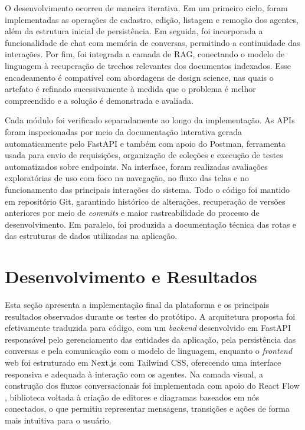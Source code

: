\documentclass[12pt, openright, oneside, a4paper, brazil]{ads-unipac-abntex2}
\begin{document}
O desenvolvimento ocorreu de maneira iterativa. Em um primeiro ciclo, foram implementadas as operações de cadastro, edição, listagem e remoção dos agentes, além da estrutura inicial de persistência. Em seguida, foi incorporada a funcionalidade de chat com memória de conversas, permitindo a continuidade das interações. Por fim, foi integrada a camada de RAG, conectando o modelo de linguagem à recuperação de trechos relevantes dos documentos indexados. Esse encadeamento é compatível com abordagens de design science, nas quais o artefato é refinado sucessivamente à medida que o problema é melhor compreendido e a solução é demonstrada e avaliada. 

Cada módulo foi verificado separadamente ao longo da implementação. As APIs foram inspecionadas por meio da documentação interativa gerada automaticamente pelo FastAPI e também com apoio do Postman, ferramenta usada para envio de requisições, organização de coleções e execução de testes automatizados sobre endpoints. Na interface, foram realizadas avaliações exploratórias de uso com foco na navegação, no fluxo das telas e no funcionamento das principais interações do sistema. Todo o código foi mantido em repositório Git, garantindo histórico de alterações, recuperação de versões anteriores por meio de \textit{commits} e maior rastreabilidade do processo de desenvolvimento. Em paralelo, foi produzida a documentação técnica das rotas e das estruturas de dados utilizadas na aplicação.

 

\chapter[Desenvolvimento e Resultados]{Desenvolvimento e Resultados}
Esta seção apresenta a implementação final da plataforma e os principais resultados observados durante os testes do protótipo. A arquitetura proposta foi efetivamente traduzida para código, com um \textit{backend} desenvolvido em FastAPI responsável pelo gerenciamento das entidades da aplicação, pela persistência das conversas e pela comunicação com o modelo de linguagem, enquanto o \textit{frontend} web foi estruturado em Next.js com Tailwind CSS, oferecendo uma interface responsiva e adequada à interação com os agentes. Na camada visual, a construção dos fluxos conversacionais foi implementada com apoio do React Flow \cite{reactflow2023}, biblioteca voltada à criação de editores e diagramas baseados em nós conectados, o que permitiu representar mensagens, transições e ações de forma mais intuitiva para o usuário. 
\end{document}
